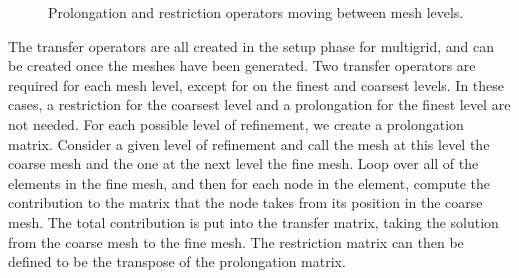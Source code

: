 \begin{figure}[h]
	\centering
	
	\caption{\label{fig:pro_res_ops} Prolongation and restriction operators moving between mesh levels.}
\end{figure}

The transfer operators are all created in the setup phase for multigrid, and can be created once the meshes have been generated.
Two transfer operators are required for each mesh level, except for on the finest and coarsest levels.
In these cases, a restriction for the coarsest level and a prolongation for the finest level are not needed.
For each possible level of refinement, we create a prolongation matrix.
Consider a given level of refinement and call the mesh at this level the coarse mesh and the one at the next level the fine mesh.
Loop over all of the elements in the fine mesh, and then for each node in the element, compute the contribution to the matrix that the node takes from its position in the coarse mesh.
The total contribution is put into the transfer matrix, taking the solution from the coarse mesh to the fine mesh.
The restriction matrix can then be defined to be the transpose of the prolongation matrix.





